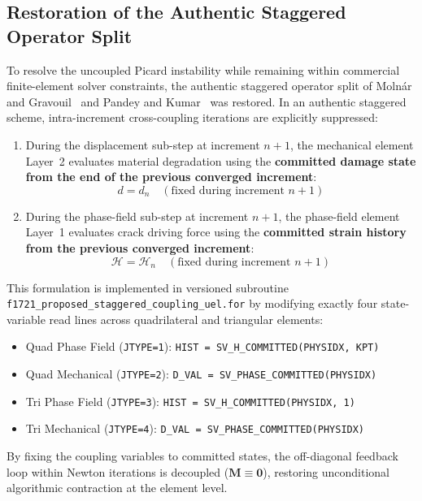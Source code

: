 \subsection{Restoration of the Authentic Staggered Operator Split}
\label{subsec:f1721_staggered_remediation}

To resolve the uncoupled Picard instability while remaining within commercial finite-element solver constraints, the authentic staggered operator split of Moln\'{a}r and Gravouil~\cite{molnar2017} and Pandey and Kumar~\cite{pandey2025} was restored. In an authentic staggered scheme, intra-increment cross-coupling iterations are explicitly suppressed:
\begin{enumerate}
  \item During the displacement sub-step at increment $n+1$, the mechanical element Layer~2 evaluates material degradation using the \textbf{committed damage state from the end of the previous converged increment}:
  \begin{equation}
    d = d_n \quad (\text{fixed during increment } n+1)
    \label{eq:staggered_mech}
  \end{equation}
  \item During the phase-field sub-step at increment $n+1$, the phase-field element Layer~1 evaluates crack driving force using the \textbf{committed strain history from the previous converged increment}:
  \begin{equation}
    \mathcal{H} = \mathcal{H}_n \quad (\text{fixed during increment } n+1)
    \label{eq:staggered_pf}
  \end{equation}
\end{enumerate}

This formulation is implemented in versioned subroutine \texttt{f1721\_proposed\_staggered\_coupling\_uel.for} by modifying exactly four state-variable read lines across quadrilateral and triangular elements:
\begin{itemize}
  \item Quad Phase Field (\texttt{JTYPE=1}): \texttt{HIST = SV\_H\_COMMITTED(PHYSIDX, KPT)}
  \item Quad Mechanical (\texttt{JTYPE=2}): \texttt{D\_VAL = SV\_PHASE\_COMMITTED(PHYSIDX)}
  \item Tri Phase Field (\texttt{JTYPE=3}): \texttt{HIST = SV\_H\_COMMITTED(PHYSIDX, 1)}
  \item Tri Mechanical (\texttt{JTYPE=4}): \texttt{D\_VAL = SV\_PHASE\_COMMITTED(PHYSIDX)}
\end{itemize}
By fixing the coupling variables to committed states, the off-diagonal feedback loop within Newton iterations is decoupled ($\mathbf{M} \equiv \mathbf{0}$), restoring unconditional algorithmic contraction at the element level.

